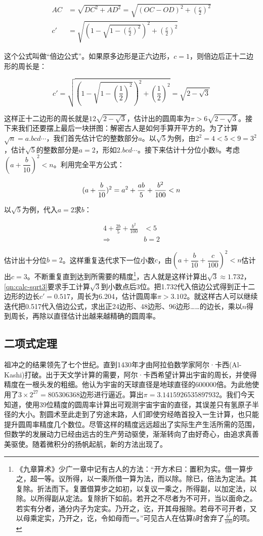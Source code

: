 \documentclass[b5paper]{ctexart}
\begin{document}
\begin{align}
AC &= \sqrt{DC^2 + AD^2} = \sqrt{(OC - OD)^2 + (\frac{c}{2})^2}  \\
c' &= \sqrt{(1 - \sqrt{1 - (\frac{c}{2})^2})^2 + (\frac{c}{2})^2}
\label{eq:double-edges}
\end{align}

这个公式叫做“倍边公式”。如果原多边形是正六边形，$c = 1$，则倍边后正十二边形的周长是：

\[
c' = \sqrt{(1 - \sqrt{1 - (\frac{1}{2})^2})^2 + (\frac{1}{2})^2} = \sqrt{2 - \sqrt{3}}
\]

这样正十二边形的周长就是$12\sqrt{2 - \sqrt{3}}$，估计出的圆周率为$\pi > 6\sqrt{2 - \sqrt{3}}$。接下来我们还要摆上最后一块拼图：解密古人是如何手算开平方的。为了计算$\sqrt{n} = a.bcd\dotsm$，我们首先估计它的整数部分$a$。以$\sqrt{5}$为例，由$2^2 = 4 < 5 < 9 = 3^2$，估计$\sqrt{5}$的整数部分是$a = 2$，形如$2.bcd\dotsm$。接下来估计十分位小数$b$。考虑$(a + \dfrac{b}{10})^2 < n$。利用完全平方公式：

\[
(a + \frac{b}{10})^2 = a^2 + \frac{ab}{5} + \frac{b^2}{100}  < n \\
\]

以$\sqrt{5}$为例，代入$a = 2$求$b$：

\begin{align*}
4 + \frac{2b}{5} + \frac{b^2}{100} &< 5 \\
 \Rightarrow & b = 2
\end{align*}

估计出十分位$b = 2$。这样重复迭代求下一位小数$c$，由$(a + \dfrac{b}{10} + \dfrac{c}{100})^2 < n$估计出$c = 3$。不断重复直到达到所需要的精度\footnote{《九章算术》少广一章中记有古人的方法：“开方术曰：置积为实。借一算步之，超一等。议所得，以一乘所借一算为法，而以除。除已，倍法为定法。其复除。折法而下。复置借算步之如初，以复议一乘之，所得副，以加定法，以除。以所得副从定法。复除折下如前。若开之不尽者为不可开，当以面命之。若实有分者，通分内子为定实。乃开之，讫，开其母报除。若母不可开者，又以母乘定实，乃开之，讫，令如母而一。”可见古人在估算$b$时舍弃了$\frac{b^2}{100}$的项。}，古人就是这样计算出$\sqrt{3} \approx 1.732$，\cref{qn:calc-sqrt3}要求手工计算$\sqrt{3}$到小数点后3位。把1.732代入倍边公式得到正十二边形的边长$c' = 0.517$，周长为6.204，估计圆周率$\pi > 3.102$。就这样古人可以继续迭代把0.517代入倍边公式，求出正24边形、48边形、96边形……的边长，乘以$n$得到周长，再除以直径估计出越来越精确的圆周率。

\subsection{二项式定理}
祖冲之的结果领先了七个世纪。直到1430年才由阿拉伯数学家阿尔·卡西(Al-Kashi)打破。出于天文学计算的需要，阿尔·卡西希望计算出宇宙的周长，并使得精度在一根头发的粗细。他认为宇宙的天球直径是地球直径的600000倍。为此他使用了$3 \times 2^{27} = 805306368$边形进行逼近。算出$\pi = 3.1415926535897932$。我们今天知道，使用39位精度的圆周率计算出可观测宇宙宇宙的直径，其误差只有氢原子半径的大小。割圆术至此走到了穷途末路，人们即使穷经皓首投入一生计算，也只能提升圆周率精度几个数位。尽管这样的精度远远超出了实际生产生活所需的范围，但数学的发展动力已经由远古的生产劳动驱使，渐渐转向了由好奇心，由追求真善美驱使。随着微积分的扬帆起航，新的方法出现了。
\end{document}
